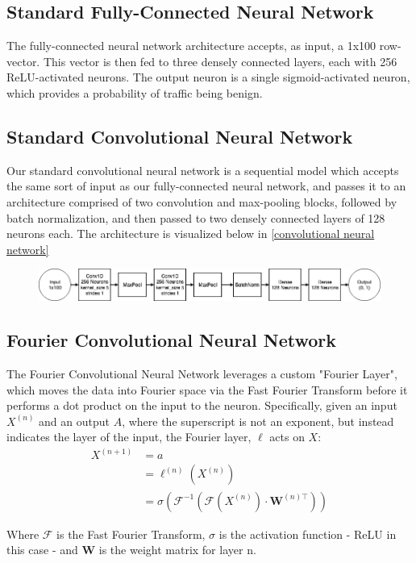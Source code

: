 \documentclass[10pt]{article}
\begin{document}
\subsection{Standard Fully-Connected Neural Network}
The fully-connected neural network architecture accepts, as input, a 1x100 row-vector. 
This vector is then fed to three densely connected layers, each with 256 ReLU-activated neurons.
The output neuron is a single sigmoid-activated neuron, which provides a probability of traffic being benign.

\subsection{Standard Convolutional Neural Network}
Our standard convolutional neural network is a sequential model which accepts the same sort of input as our fully-connected neural network, and passes it to an architecture comprised of two convolution and max-pooling blocks, followed by batch normalization, and then passed to two densely connected layers of 128 neurons each. The architecture is visualized below in \ref{convolutional neural network}

\begin{figure}
\includegraphics[width=\textwidth]{conv_architecture}
\centering
\end{figure}

\subsection{Fourier Convolutional Neural Network}
The Fourier Convolutional Neural Network leverages a custom "Fourier Layer", which moves the data into Fourier space via the Fast Fourier Transform before it performs a dot product on the input to the neuron.
Specifically, given an input $X^{(n)}$ and an output $A$, where the superscript is not an exponent, but instead indicates the layer of the input, the Fourier layer, $\ell$ acts on $X$: 
\begin{align*}
X^{(n+1)} & = a \\
& = \ell^{(n)}(X^{(n)}) \\
& = \sigma(\mathcal{F}^{-1}(\mathcal{F}(X^{(n)})\cdot \mathbf{W}^{(n)\top}))
\end{align*}

Where $\mathcal{F}$ is the Fast Fourier Transform, $\sigma$ is the activation function - ReLU in this case - and $\mathbf{W}$ is the weight matrix for layer n.
\end{document}

